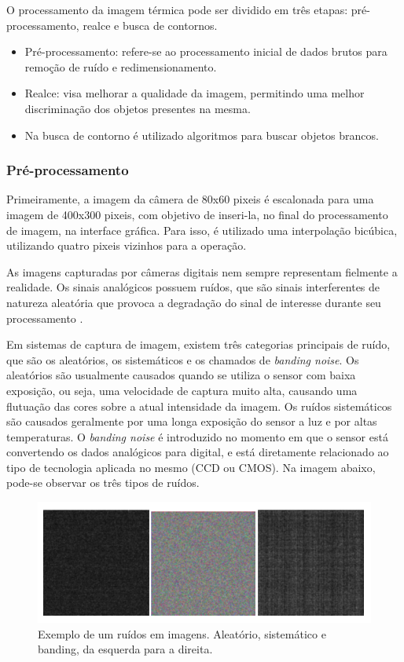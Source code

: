 		O processamento da imagem térmica pode ser dividido em três etapas:  pré-processamento, realce e busca de contornos.
		
		\begin{itemize}
			\item Pré-processamento: refere-se ao processamento inicial de dados brutos para remoção de ruído e redimensionamento.
			\item Realce: visa melhorar a qualidade da imagem, permitindo uma melhor discriminação dos objetos presentes na mesma.
			\item Na busca de contorno é utilizado algoritmos para buscar objetos brancos.
		\end{itemize}
		
		\subsubsection{Pré-processamento}
		
		Primeiramente, a imagem da câmera de 80x60 pixeis é escalonada para uma imagem de 400x300 pixeis, com objetivo de inseri-la, no final do processamento de imagem, na interface gráfica. Para isso, é utilizado uma interpolação bicúbica, utilizando quatro pixeis vizinhos para a operação.
		
		As imagens capturadas por câmeras digitais nem sempre representam fielmente a realidade. Os sinais analógicos possuem ruídos, que são sinais interferentes de natureza aleatória que provoca a degradação do sinal de interesse durante seu processamento \cite{fabris}.
		
		Em sistemas de captura de imagem, existem três categorias principais de ruído, que são os aleatórios, os sistemáticos e os chamados de \textit{banding noise}. Os aleatórios são usualmente causados quando se utiliza o sensor com baixa exposição, ou seja, uma velocidade de captura muito alta, causando uma flutuação das cores sobre a atual intensidade da imagem. Os ruídos sistemáticos são causados geralmente por uma longa exposição do sensor a luz e por altas temperaturas. O \textit{banding noise} é introduzido no momento em que o sensor está convertendo os dados analógicos para digital, e está diretamente relacionado ao tipo de tecnologia aplicada no mesmo (CCD ou CMOS). Na imagem abaixo, pode-se observar os três tipos de ruídos.
	
		\begin{figure}[!ht]
		   \centering
		   \includegraphics[width=14cm]{Figures/noise.png}
		   \caption{Exemplo de um ruídos em imagens. Aleatório, sistemático e banding, da esquerda para a direita.}
		   \label{fig:noise}
		\end{figure}
		
